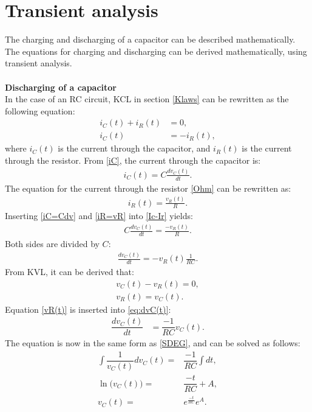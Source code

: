 \section{Transient analysis}
\label{sec371}
The charging and discharging of a capacitor can be described mathematically. The equations for charging and discharging can be derived mathematically, using transient analysis.
\\
\\
\noindent\textbf{Discharging of a capacitor}\\
In the case of an RC circuit, KCL in section \ref{Klaws} can be rewritten as the following equation:
\begin{align}
i_{C}(t)+i_{R}(t)&=0, \nonumber \\
i_{C}(t)&= -i_{R}(t), \label{Ic-Ir}
\end{align}
where $i_C(t)$ is the current through the capacitor, and $i_R(t)$ is the current through the resistor. From \eqref{iC}, the current through the capacitor is:
\begin{align}
	i_C(t) = C\frac{dv_C(t)}{dt}.\label{iC=Cdv}
\end{align}
The equation for the current through the resistor \eqref{Ohm} can be rewritten as:
\begin{align}
	i_R(t) = \frac{v_R(t)}{R}. \label{iR=vR}
\end{align}
Inserting \eqref{iC=Cdv} and \eqref{iR=vR} into \eqref{Ic-Ir} yields:
\begin{align*}
	C\frac{dv_C(t)}{dt} = \frac{-v_R(t)}{R}.
\end{align*}
Both sides are divided by $C$:
\begin{align}
	\frac{dv_C(t)}{dt} =-v_R(t) \frac{1}{RC}.
	\label{eq:dvC(t)}
\end{align}
From KVL, it can be derived that:
\begin{align}
	v_C(t)- v_R(t) = 0, \nonumber\\
	v_R(t) = v_C(t). \label{vR(t)}
\end{align}
Equation \eqref{vR(t)} is inserted into \eqref{eq:dvC(t)}:
\begin{align*}
	\dfrac{dv_C(t)}{dt} &= \dfrac{-1}{RC}v_C(t).
\end{align*}
The equation is now in the same form as \eqref{SDEG}, and can be solved as follows:
\begin{align}
\int \dfrac{1}{v_C(t)}dv_C(t) =& \dfrac{-1}{RC} \int dt, \nonumber \\
\ln\big(v_C(t)\big) =& \dfrac{-t}{RC} + A, \nonumber\\
v_C(t) =& e^{\frac{-t}{RC}}e^{A}.\label{V_eA}
\end{align}
